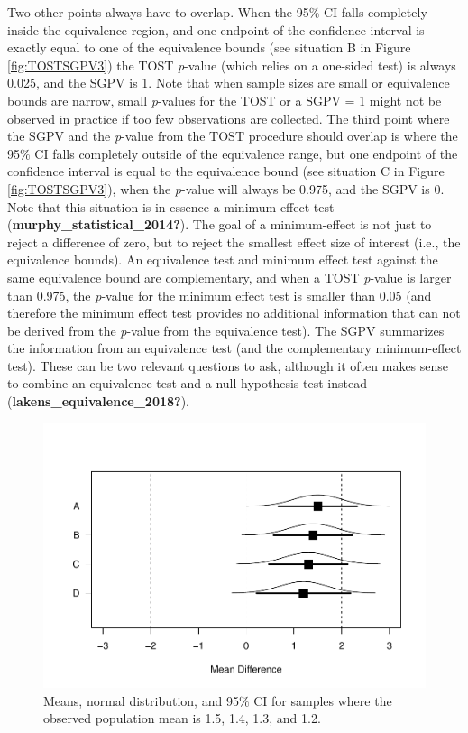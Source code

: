 \documentclass[
  english,
  man]{apa6}
\begin{document}
Two other points always have to overlap. When the 95\(\%\) CI falls completely inside the equivalence region, and one endpoint of the confidence interval is exactly equal to one of the equivalence bounds (see situation B in Figure \ref{fig:TOSTSGPV3}) the TOST \emph{p}-value (which relies on a one-sided test) is always 0.025, and the SGPV is 1. Note that when sample sizes are small or equivalence bounds are narrow, small \emph{p}-values for the TOST or a SGPV = 1 might not be observed in practice if too few observations are collected. The third point where the SGPV and the \emph{p}-value from the TOST procedure should overlap is where the 95\(\%\) CI falls completely outside of the equivalence range, but one endpoint of the confidence interval is equal to the equivalence bound (see situation C in Figure \ref{fig:TOSTSGPV3}), when the \emph{p}-value will always be 0.975, and the SGPV is 0. Note that this situation is in essence a minimum-effect test (\textbf{murphy\_statistical\_2014?}). The goal of a minimum-effect is not just to reject a difference of zero, but to reject the smallest effect size of interest (i.e., the equivalence bounds). An equivalence test and minimum effect test against the same equivalence bound are complementary, and when a TOST \emph{p}-value is larger than 0.975, the \emph{p}-value for the minimum effect test is smaller than 0.05 (and therefore the minimum effect test provides no additional information that can not be derived from the \emph{p}-value from the equivalence test). The SGPV summarizes the information from an equivalence test (and the complementary minimum-effect test). These can be two relevant questions to ask, although it often makes sense to combine an equivalence test and a null-hypothesis test instead (\textbf{lakens\_equivalence\_2018?}).

\begin{figure}

{\centering \includegraphics[height=0.94\textheight]{chp5_format-Rmd_bib_files/figure-latex/TOSTSGPV4-1} 

}

\caption{Means, normal distribution, and 95$\%$ CI for samples where the observed population mean is 1.5, 1.4, 1.3, and 1.2.}\label{fig:TOSTSGPV4}
\end{figure}
\end{document}
